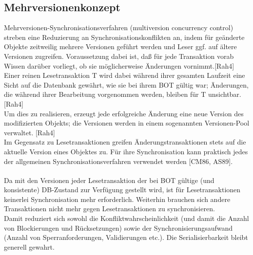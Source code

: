 \documentclass[letterpaper, 12pt]{article}
\let\tempsubsection\subsection
\renewcommand\subsection[1]{\vspace{0cm}\tempsubsection{#1}\vspace{0cm}}
\begin{document}
\subsection{Mehrversionenkonzept}
Mehrversionen-Synchronisationsverfahren (multiversion concurrency control) streben eine Reduzierung an Synchronisationskonflikten an, indem für geänderte Objekte zeitweilig mehrere Versionen geführt werden und Leser ggf. auf ältere Versionen zugreifen. Voraussetzung dabei ist, daß für jede Transaktion vorab Wissen darüber vorliegt, ob sie möglicherweise Änderungen vornimmt.[Rah4]
\\
Einer reinen Lesetransaktion T wird dabei während ihrer gesamten Laufzeit eine Sicht auf die Datenbank gewährt, wie sie bei ihrem BOT gültig war; Änderungen, die während ihrer Bearbeitung vorgenommen werden, bleiben für T unsichtbar. [Rah4]
\\
Um dies zu realisieren, erzeugt jede erfolgreiche Änderung eine neue Version des modifizierten Objekts; die Versionen werden in einem sogenannten Versionen-Pool verwaltet. [Rah4]
\\
Im Gegensatz zu Lesetransaktionen greifen Änderungstransaktionen stets auf die aktuelle Version eines Objektes zu. Für ihre Synchronisation kann praktisch jedes der allgemeinen Synchronisationsverfahren verwendet werden [CM86, AS89].
\\\\
Da mit den Versionen jeder Lesetransaktion der bei BOT gültige (und konsistente) DB-Zustand zur Verfügung gestellt wird, ist für Lesetransaktionen keinerlei Synchronisation mehr erforderlich. Weiterhin brauchen sich andere Transaktionen nicht mehr gegen Lesetransaktionen zu synchronisieren.\\
Damit reduziert sich sowohl die Konfliktwahrscheinlichkeit (und damit die Anzahl von Blockierungen und Rücksetzungen) sowie der Synchronisierungsaufwand (Anzahl von Sperranforderungen, Validierungen etc.). Die Serialisierbarkeit bleibt generell gewahrt.
\end{document}
